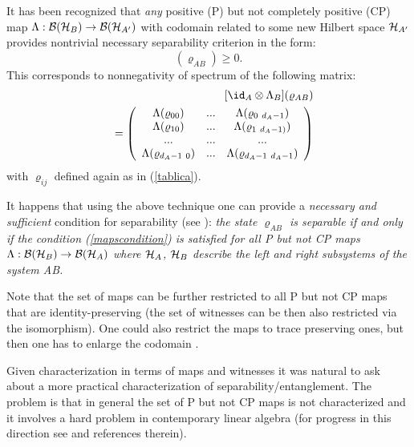 \documentclass[twocolumn,aps,rmp]{revtex4}
\begin{document}
It has been recognized that {\it any} positive (P) but not completely
positive (CP) map $\Lambda:{\cal B}({\cal H}_{B}) \rightarrow {\cal
  B}({\cal H}_{A'})$ with codomain related to some new Hilbert space
${\cal H}_{A'}$ provides nontrivial necessary separability criterion
in the form:
\begin{equation}
  [\id_{A} \otimes \Lambda_{B}](\varrho_{AB})\geq 0.
  \label{mapscondition}
\end{equation}
This corresponds to nonnegativity of spectrum of the following matrix:
\begin{eqnarray}
&& [\id _{A} \otimes \Lambda_{B}] (\varrho_{AB}) \nonumber \\
&& =\left(\begin{array}{ccc}
\Lambda(\varrho_{00}) &  ... & \Lambda(\varrho_{0 \ d_{A}-1})\\
\Lambda(\varrho_{10}) &  ... & \Lambda(\varrho_{1 \ d_{A}-1)})\\
 ...  &   ...   & ...  \\
\Lambda(\varrho_{d_{A}-1 \ 0}) &
... & \Lambda(\varrho_{d_{A}-1  \ d_{A}-1})
\end{array} \right)
\end{eqnarray}
with $\varrho_{ij}$ defined again as in (\ref{tablica}).

It happens that using the above technique one can provide a {\it
  necessary and sufficient} condition for separability (see
\cite{sep1996}): {\it the state $\varrho_{AB}$ is separable if and
  only if the condition (\ref{mapscondition}) is satisfied for all P
  but not CP maps $\Lambda: {\cal B}({\cal H}_{B}) \rightarrow {\cal
    B}({\cal H}_{A})$ where ${\cal H}_{A}$, ${\cal H}_{B}$ describe
  the left and right subsystems of the system AB.}

Note that the set of maps can be further restricted to all P but not
CP maps that are identity-preserving \cite{Pawel2001-NATO} (the set of
witnesses can be then also restricted via the isomorphism). One could
also restrict the maps to trace preserving ones, but then one has to
enlarge the codomain \cite{HHH02-permut}.

Given characterization in terms of maps and witnesses it was natural
to ask about a more practical characterization of
separability/entanglement. The problem is that in general the set of P
but not CP maps is not characterized and it involves a hard problem in
contemporary linear algebra (for progress in this direction see
\cite{Kossakowski} and references therein).
\end{document}
